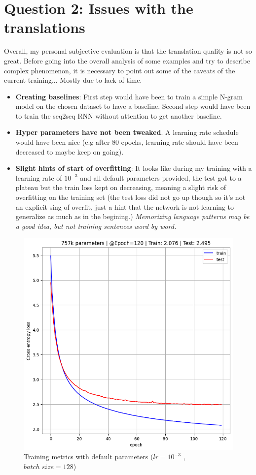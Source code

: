 \documentclass[a4paper]{article}
\begin{document}
\section{Question 2: Issues with the translations}
Overall, my personal subjective evaluation is that the translation quality is not so great.
Before going into the overall analysis of some examples and try to describe complex phenomenon, it is necessary to point out some of the caveats of the current training... Mostly due to lack of time.
\begin{itemize}
\item \textbf{Creating baselines}: First step would have been to train a simple N-gram model on the chosen dataset to have a baseline. Second step would have been to train the seq2seq RNN without attention to get another baseline.
\item \textbf{Hyper parameters have not been tweaked}. A learning rate schedule would have been nice (e.g after 80 epochs, learning rate should have been decreased to maybe keep on going).
\item \textbf{Slight hints of start of overfitting}: It looks like during my training with a learning rate of $10^{-3}$ and all default parameters provided, the test got to a plateau but the train loss kept on decreasing, meaning a slight risk of overfitting on the training set (the test loss did not go up though so it's not an explicit sing of overfit, just a hint that the network is not learning to generalize as much as in the begining.)\textit{ Memorizing language patterns may be a good idea, but not training sentences word by word.}
\end{itemize}

\begin{figure}[ht]
    \centering
	\includegraphics[width=.6\textwidth]{figures/training_curve.png}
	\caption{Training metrics with default parameters ($lr=10^{-3}$ , $batch\;size=128$) \label{fig:metric}}
\end{figure}
\end{document}
